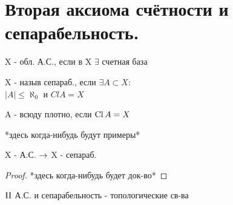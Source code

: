 \documentclass[geometry.tex]{subfiles}
\begin{document}
  \section{Вторая аксиома счётности и сепарабельность.}

  \begin{definition}
      X - обл.  А.С., если в X $\exists$ счетная база
  \end{definition}

  \begin{definition}
      X - назыв сепараб., если $\exists A \subset X$:\\
      $|A| \leq \aleph_0$ и $Cl A = X$
  \end{definition}

  \begin{definition}
      A - всюду плотно, если $\mathop{\rm Cl}\nolimits A = X$
  \end{definition}

  \begin{examples}
      *здесь когда-нибудь будут примеры*
  \end{examples}

  \begin{theorem}
      X -  А.С. $\rightarrow$ X - сепараб.
  \end{theorem}

  \begin{proof}
      *здесь когда-нибудь будет док-во*
  \end{proof}

  \begin{upr}
      $\RNumb{2}$ А.С. и сепарабельность - топологические св-ва
  \end{upr}
\end{document}
